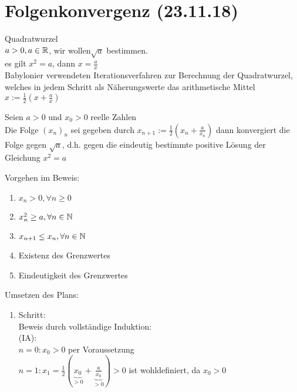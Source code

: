 \documentclass[../ana1u.tex]{subfiles}
\begin{document}
\setcounter{section}{4}

\section{Folgenkonvergenz (23.11.18)}
\begin{bsp}
    Quadratwurzel\\
    \(a > 0, a \in \mathbb{R}\), wir wollen\(\sqrt{a}\) bestimmen.\\
    es gilt \(x^2 = a\), dann \(x = \frac{a}{x}\)\vspace{5mm}\\
    Babylonier verwendeten Iterationsverfahren zur Berechnung der Quadratwurzel, welches in jedem Schritt als Näherungswerte das arithmetische Mittel\vspace{5mm}\\
    \(x := \frac{1}{2}(x+\frac{a}{x})\)
    \begin{beh}
        Seien \(a > 0\) und \(x_0 > 0\) reelle Zahlen\\
        Die Folge \((x_n)_n\) sei gegeben durch \(x_{n+1} := \frac{1}{2}(x_n + \frac{a}{x_n})\) dann konvergiert die Folge gegen \(\sqrt{a}\), d.h. gegen die eindeutig bestimmte positive Lösung der Gleichung \(x^2 = a\)
    \end{beh}		
    Vorgehen im Beweis:
    \begin{enumerate}
        \item \(x_n > 0, \forall n \geq 0\)
        \item \(x_n^2 \geq a, \forall n \in \mathbb{N}\)
        \item \(x_{n+1} \leq x_n, \forall n \in \mathbb{N}\)
        \item Existenz des Grenzwertes
        \item Eindeutigkeit des Grenzwertes
    \end{enumerate}
    \begin{bew}
        Umsetzen des Plans:\\
        \begin{enumerate}				
            \item Schritt:\\
                Beweis durch vollständige Induktion:\\
                (IA):\\
                \(n=0: x_0 > 0\) per Voraussetzung\\
                \(n=1: x_1 = \frac{1}{2}(\underbrace{x_0}_{>0} + \underbrace{\frac{a}{x_0}}_{>0}) > 0\) ist wohldefiniert, da \(x_0 > 0\)\\

\end{enumerate}
\end{bew}
\end{bsp}
\end{document}
